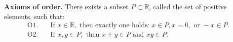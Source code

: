 \textbf{Axioms of order.} There exists a subset $P \subset \mathbb{R}$, called the set of positive elements, such that:
\begin{align}
\text{O1.}&\quad \text{If } x \in \mathbb{R}, \text{ then exactly one holds: } x \in P, x = 0, \text{ or } -x \in P. \\
\text{O2.}&\quad \text{If } x, y \in P, \text{ then } x + y \in P \text{ and } xy \in P.
\end{align}
